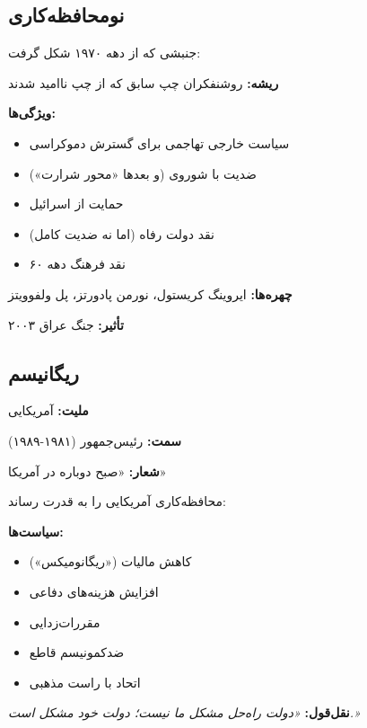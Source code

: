 \subsection{نومحافظه‌کاری}

\begin{defbox}
جنبشی که از دهه ۱۹۷۰ شکل گرفت:

\textbf{ریشه:} روشنفکران چپ سابق که از چپ ناامید شدند

\textbf{ویژگی‌ها:}
\begin{itemize}[nosep]
    \item سیاست خارجی تهاجمی برای گسترش دموکراسی
    \item ضدیت با شوروی (و بعدها «محور شرارت»)
    \item حمایت از اسرائیل
    \item نقد دولت رفاه (اما نه ضدیت کامل)
    \item نقد فرهنگ دهه ۶۰
\end{itemize}

\textbf{چهره‌ها:} ایروینگ کریستول، نورمن پادورتز، پل ولفوویتز

\textbf{تأثیر:} جنگ عراق ۲۰۰۳
\end{defbox}

\subsection{ریگانیسم}

\begin{personbox}

\textbf{ملیت:} آمریکایی

\textbf{سمت:} رئیس‌جمهور (۱۹۸۱-۱۹۸۹)

\textbf{شعار:} «صبح دوباره در آمریکا»

\mediumspace

 محافظه‌کاری آمریکایی را به قدرت رساند:

\textbf{سیاست‌ها:}
\begin{itemize}[nosep]
    \item کاهش مالیات («ریگانومیکس»)
    \item افزایش هزینه‌های دفاعی
    \item مقررات‌زدایی
    \item ضدکمونیسم قاطع
    \item اتحاد با راست مذهبی
\end{itemize}

\mediumspace

\textbf{نقل‌قول:} \textit{«دولت راه‌حل مشکل ما نیست؛ دولت خود مشکل است.»}
\end{personbox}

